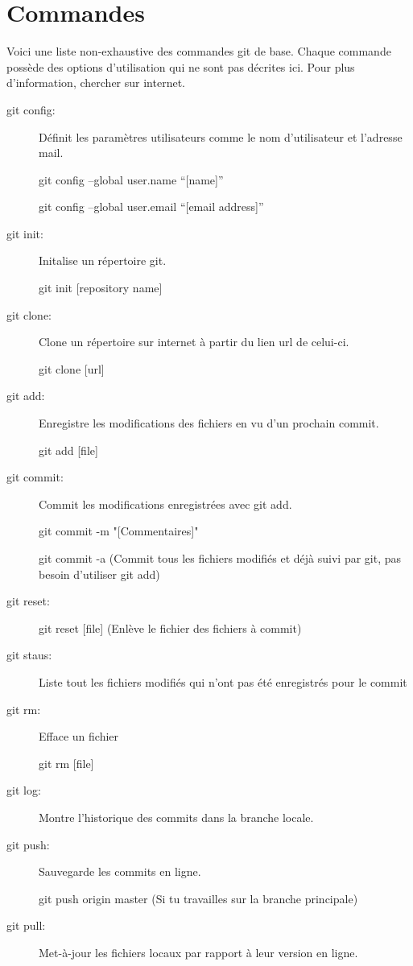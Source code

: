 \documentclass[a4paper, 11pt]{report}
\begin{document}
\section{Commandes}
Voici une liste non-exhaustive des commandes git de base. Chaque commande possède des options d’utilisation qui ne sont pas décrites ici. Pour plus d'information, chercher sur internet.


\begin{description}
\item[git config:] Définit les paramètres utilisateurs comme le nom d'utilisateur et l'adresse mail.

git config –global user.name “[name]”

git config –global user.email “[email address]”

\item[git init:]Initalise un répertoire git.

git init [repository name]

\item[git clone:]Clone un répertoire sur internet à partir du lien url de celui-ci.

git clone [url]

\item[git add:]Enregistre les modifications des fichiers en vu d'un prochain commit.

git add [file]

\item[git commit:] Commit les modifications enregistrées avec git add.

git commit -m "[Commentaires]"

git commit -a (Commit tous les fichiers modifiés et déjà suivi par git, pas besoin d'utiliser git add)

\item[git reset:]

git reset [file] (Enlève le fichier des fichiers à commit)

\item[git staus:] Liste tout les fichiers modifiés qui n'ont pas été enregistrés pour le commit

\item[git rm:] Efface un fichier

git rm [file]

\item[git log:] Montre l'historique des commits dans la branche locale.

\item[git push:] Sauvegarde les commits en ligne.

git push origin master (Si tu travailles sur la branche principale)

\item[git pull:] Met-à-jour les fichiers locaux par rapport à leur version en ligne.

\end{description}
\end{document}
